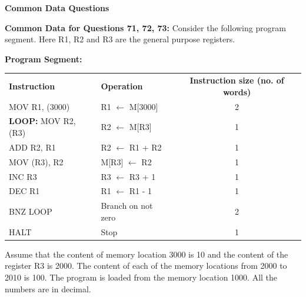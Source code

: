 \documentclass[journal,12pt,onecolumn]{IEEEtran}
\theoremstyle{remark}
\begin{document}
\begin{enumerate}
\begin{center}
 
\textbf{Common Data Questions}
\end{center}

\textbf{Common Data for Questions 71, 72, 73:}
\newline
Consider the following program segment. Here R1, R2 and R3 are the general purpose registers.


    \textbf{Program Segment:}

    \begin{center}
    \begin{tabular}{l l c}
    
    \textbf{Instruction} & \textbf{Operation} & \textbf{Instruction size (no. of words)} \\ 
    MOV R1, (3000) & R1 $\leftarrow$ M[3000] & 2 \\ 
    \textbf{LOOP:} MOV R2, (R3) & R2 $\leftarrow$ M[R3] & 1 \\ 
    ADD R2, R1 & R2 $\leftarrow$ R1 + R2 & 1 \\ 
    MOV (R3), R2 & M[R3] $\leftarrow$ R2 & 1 \\ 
    INC R3 & R3 $\leftarrow$ R3 + 1 & 1 \\ 
    DEC R1 & R1 $\leftarrow$ R1 - 1 & 1 \\ 
    BNZ LOOP & Branch on not zero & 2 \\ 
    HALT & Stop & 1 \\ 
    \end{tabular}
    \end{center}

     Assume that the content of memory location 3000 is 10 and the content of the register R3 is 2000. The content of each of the memory locations from 2000 to 2010 is 100. The program is loaded from the memory location 1000. All the numbers are in decimal.
    

\end{enumerate}
\end{document}
